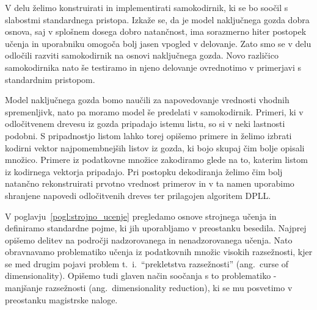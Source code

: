 \documentclass[12pt,a4paper,twoside]{article}
\theoremstyle{definition} %
\theoremstyle{plain} %
\numberwithin{equation}{section}  %
\begin{document}
V delu želimo konstruirati in implementirati samokodirnik, ki se bo soočil s slabostmi standardnega pristopa.
Izkaže se, da je model naključnega gozda dobra osnova, saj v splošnem dosega dobro natančnost, ima sorazmerno hiter postopek učenja in uporabniku omogoča bolj jasen vpogled v delovanje.
Zato smo se v delu odločili razviti samokodirnik na osnovi naključnega gozda.
Novo različico samokodirnika nato še testiramo in njeno delovanje ovrednotimo v primerjavi s standardnim pristopom.

Model naključnega gozda bomo naučili za napovedovanje vrednosti vhodnih spremenljivk, nato pa moramo model še predelati v samokodirnik.
Primeri, ki v odločitvenem drevesu iz gozda pripadajo istemu listu, so si v neki lastnosti podobni.
S pripadnostjo listom lahko torej opišemo primere in želimo izbrati kodirni vektor najpomembnejših listov iz gozda, ki bojo skupaj čim bolje opisali množico.
Primere iz podatkovne množice zakodiramo glede na to, katerim listom iz kodirnega vektorja pripadajo.
Pri postopku dekodiranja želimo čim bolj natančno rekonstruirati prvotno vrednost primerov in v ta namen uporabimo shranjene napovedi odločitvenih dreves ter prilagojen algoritem DPLL.


V poglavju~\ref{pogl:strojno_ucenje} pregledamo osnove strojnega učenja in definiramo standardne pojme, ki jih uporabljamo v preostanku besedila. 
Najprej opišemo delitev na področji nadzorovanega in nenadzorovanega učenja.
Nato obravnavamo problematiko učenja iz podatkovnih množic visokih razsežnosti, 
kjer se med drugim pojavi problem t.~i.~``prekletstva razsežnosti'' (ang.~curse of dimensionality). 
Opišemo tudi glaven način soočanja s to problematiko - manjšanje razsežnosti (ang.~dimensionality reduction), ki se mu posvetimo v preostanku magistrske naloge.
\end{document}
